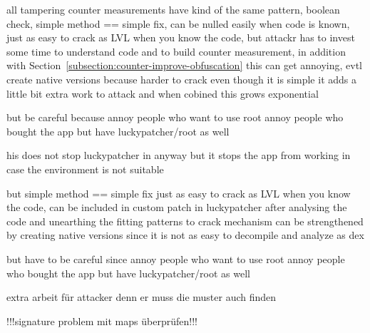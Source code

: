 all tampering counter measurements have kind of the same pattern, boolean check, simple method == simple fix, can be nulled easily when code is known, just as easy to crack as LVL when you know the code, but attackr has to invest some time to understand code and to build counter measurement, in addition with Section~\ref{subsection:counter-improve-obfuscation} this can get annoying, evtl create native versions because harder to crack
even though it is simple it adds a little bit extra work to attack and when cobined this grows exponential

but be careful because
annoy people who want to use root
annoy people who bought the app but have luckypatcher/root as well

his does not stop luckypatcher in anyway but it stops the app from working in case the environment is not suitable

but simple method == simple fix
just as easy to crack as LVL when you know the code, can be included in custom patch in luckypatcher after analysing the code and unearthing the fitting patterns to crack
mechanism can be strengthened by creating native versions since it is not as easy to decompile and analyze as dex

but have to be careful since
annoy people who want to use root
annoy people who bought the app but have luckypatcher/root as well

extra arbeit für attacker denn er muss die muster auch finden

!!!signature problem  mit maps überprüfen!!!
